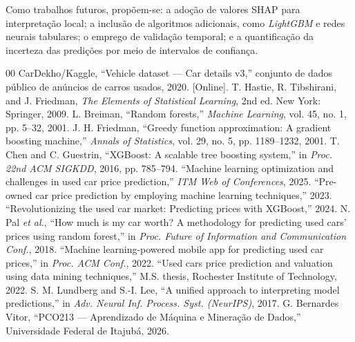 \documentclass[conference]{IEEEtran}
\begin{document}
Como trabalhos futuros, propõem-se: a adoção de valores SHAP \cite{shap} para interpretação local; a inclusão de algoritmos adicionais, como \textit{LightGBM} e redes neurais tabulares; o emprego de validação temporal; e a quantificação da incerteza das predições por meio de intervalos de confiança.

\begin{thebibliography}{00}
 CarDekho/Kaggle, ``Vehicle dataset --- Car details v3,'' conjunto de dados público de anúncios de carros usados, 2020. [Online].
 T. Hastie, R. Tibshirani, and J. Friedman, \textit{The Elements of Statistical Learning}, 2nd ed. New York: Springer, 2009.
 L. Breiman, ``Random forests,'' \textit{Machine Learning}, vol. 45, no. 1, pp. 5--32, 2001.
 J. H. Friedman, ``Greedy function approximation: A gradient boosting machine,'' \textit{Annals of Statistics}, vol. 29, no. 5, pp. 1189--1232, 2001.
 T. Chen and C. Guestrin, ``XGBoost: A scalable tree boosting system,'' in \textit{Proc. 22nd ACM SIGKDD}, 2016, pp. 785--794.
 ``Machine learning optimization and challenges in used car price prediction,'' \textit{ITM Web of Conferences}, 2025.
 ``Pre-owned car price prediction by employing machine learning techniques,'' 2023.
 ``Revolutionizing the used car market: Predicting prices with XGBoost,'' 2024.
 N. Pal \textit{et al.}, ``How much is my car worth? A methodology for predicting used cars' prices using random forest,'' in \textit{Proc. Future of Information and Communication Conf.}, 2018.
 ``Machine learning-powered mobile app for predicting used car prices,'' in \textit{Proc. ACM Conf.}, 2022.
 ``Used cars price prediction and valuation using data mining techniques,'' M.S. thesis, Rochester Institute of Technology, 2022.
 S. M. Lundberg and S.-I. Lee, ``A unified approach to interpreting model predictions,'' in \textit{Adv. Neural Inf. Process. Syst. (NeurIPS)}, 2017.
 G. Bernardes Vitor, ``PCO213 --- Aprendizado de Máquina e Mineração de Dados,'' Universidade Federal de Itajubá, 2026.
\end{thebibliography}
\end{document}
